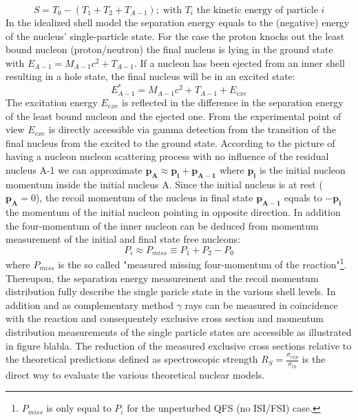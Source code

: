 \begin{equation}
S = T_0 -(T_1+T_2 +T_{A-1}); \; \text{with $T_i$ the kinetic energy of particle $i$} 
\label{eq:sep_e}
\end{equation}
In the idealized shell model the separation energy equals to the (negative) energy of the nucleus' single-particle state. For the case the proton knocks out the least bound nucleon (proton/neutron) the final nucleus is lying in the ground state with $E_{A-1} = M_{A-1}c^2  + T_{A-1}$.\newline
If a nucleon has been ejected from an inner shell resulting in a hole state, the final nucleus will be in an excited state:
\begin{equation}
E^{*}_{A-1} =  M_{A-1}c^2  +T_{A-1} + E_{exe}
\end{equation} 
The excitation energy $E_{exe}$ is reflected in the difference in the separation energy of the least bound nucleon and the ejected one. From the experimental point of view $E_{exe}$ is directly accessible via gamma detection from the transition of the final nucleus from the excited to the ground state. 
According to the picture of having a nucleon nucleon scattering process with no influence of the residual nucleus A-1 we can approximate $\mathbf{p_A} \approx \mathbf{p_i} + \mathbf{p_{A-1}}$ where $\mathbf{p_i}$ is the initial nucleon momentum inside the initial nucleus A. Since the initial nucleus is at rest ($\mathbf{p_A} = 0$), the recoil momentum of the nucleus in final state $\mathbf{p_{A-1}}$ equals to $-\mathbf{p_i}$ the momentum of the initial nucleon pointing in opposite direction. \newline
In addition the four-momentum of the inner nucleon can be deduced from momentum measurement of the initial and final state free nucleons:
\begin{equation}
P_i \approx P_{miss} \equiv P_1 + P_2  - P_0
\end{equation}
where $P_{miss}$ is the so called "measured missing four-momentum of the reaction"\cite{patsyuk2021unperturbed}\footnote{$P_{miss}$ is only equal to $P_i$ for the unperturbed QFS (no ISI/FSI) case.}.
Thereupon, the separation energy measurement and the recoil momentum distribution fully describe the single paricle state in the various shell levels. 
In addition and as complementary method $\gamma$ rays can be measured in coincidence with the reaction and consequentely exclusive cross section and momentum distribution measurements of the single particle states are accessible as illustrated in figure blabla. The reduction of the measured exclusive cross sections relative to the theoretical predictions defined as spectroscopic strength $R_S = \frac{\sigma_{exp}}{\sigma_{th}}$ is the direct way to evaluate the various theoretical nuclear models.  
